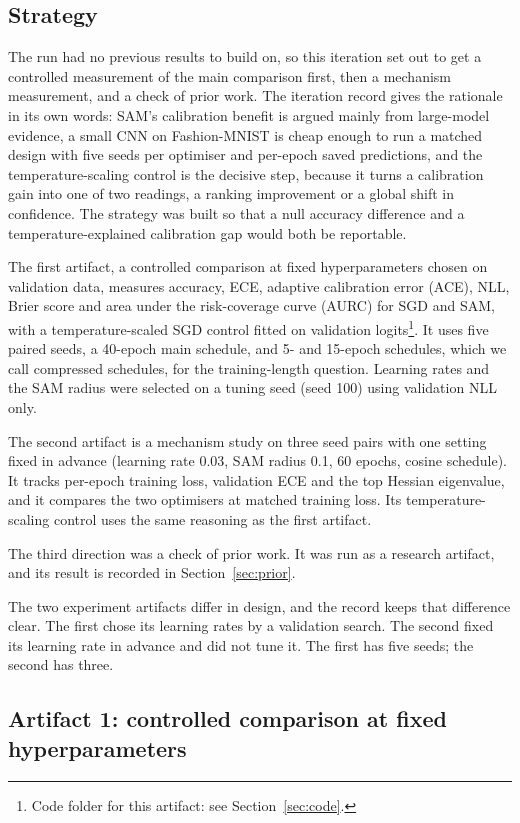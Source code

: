 \documentclass[11pt,letterpaper]{article}
\begin{document}
\subsection{Strategy}

The run had no previous results to build on, so this iteration set out to get a controlled measurement of the main comparison first, then a mechanism measurement, and a check of prior work. The iteration record gives the rationale in its own words: SAM's calibration benefit is argued mainly from large-model evidence, a small CNN on Fashion-MNIST is cheap enough to run a matched design with five seeds per optimiser and per-epoch saved predictions, and the temperature-scaling control is the decisive step, because it turns a calibration gain into one of two readings, a ranking improvement or a global shift in confidence. The strategy was built so that a null accuracy difference and a temperature-explained calibration gap would both be reportable.

The first artifact, a controlled comparison at fixed hyperparameters chosen on validation data, measures accuracy, ECE, adaptive calibration error (ACE), NLL, Brier score and area under the risk-coverage curve (AURC) for SGD and SAM, with a temperature-scaled SGD control fitted on validation logits\footnote{Code folder for this artifact: see Section~\ref{sec:code}.}. It uses five paired seeds, a 40-epoch main schedule, and 5- and 15-epoch schedules, which we call compressed schedules, for the training-length question. Learning rates and the SAM radius were selected on a tuning seed (seed 100) using validation NLL only.

The second artifact is a mechanism study on three seed pairs with one setting fixed in advance (learning rate 0.03, SAM radius 0.1, 60 epochs, cosine schedule). It tracks per-epoch training loss, validation ECE and the top Hessian eigenvalue, and it compares the two optimisers at matched training loss. Its temperature-scaling control uses the same reasoning as the first artifact.

The third direction was a check of prior work. It was run as a research artifact, and its result is recorded in Section~\ref{sec:prior}.

The two experiment artifacts differ in design, and the record keeps that difference clear. The first chose its learning rates by a validation search. The second fixed its learning rate in advance and did not tune it. The first has five seeds; the second has three.

\subsection{Artifact 1: controlled comparison at fixed hyperparameters}
\end{document}
